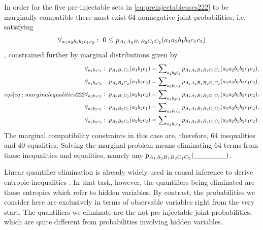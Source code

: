In order for the five pre-injectable sets in \cref{eq:preinjectableuses222} to be marginally compatible there must exist 64 nonnegative joint probabilities, i.e. satisfying
\begin{align}\label{eq:nonnegativity}
\forall_{a_1 a_2 b_1 b_2 c_1 c_2}:\;0\leq \p[A_1 A_2 B_1 B_2 C_1 C_2]{a_1 a_2 b_1 b_2 c_1 c_2}
\end{align}, constrained further by marginal distributions given by
\begin{align}\label[eqs]{eq:marginalequalities222}
\begin{split}
&\forall_{a_1 b_1 c_1}:\;\p[A_1 B_1 C_1]{a_1 b_1 c_1} = \sum\nolimits_{a_2 b_2 b_2}\p[A_1 A_2 B_1 B_2 C_1 C_2]{a_1 a_2 b_1 b_2 c_1 c_2},\\
&\forall_{a_1 b_2 c_2}:\;\p[A_2 B_2 C_2]{a_1 b_2 c_2} = \sum\nolimits_{a_2 b_1 c_1}\p[A_1 A_2 B_1 B_2 C_1 C_2]{a_1 a_2 b_1 b_2 c_1 c_2},\\
&\forall_{a_2 b_1 c_2}:\;\p[A_2 B_1 C_2]{a_2 b_1 c_2} = \sum\nolimits_{a_1 b_2 c_1}\p[A_1 A_2 B_1 B_2 C_1 C_2]{a_1 a_2 b_1 b_2 c_1 c_2},\\
&\forall_{a_2 b_2 c_1}:\;\p[A_2 B_2 C_1]{a_2 b_2 c_1} = \sum\nolimits_{a_1 b_1 c_2}\p[A_1 A_2 B_1 B_2 C_1 C_2]{a_1 a_2 b_1 b_2 c_1 c_2},\\
&\forall_{a_2 b_2 c_2}:\;\p[A_2 B_2 C_2]{a_2 b_2 c_2} = \sum\nolimits_{a_1 b_1 c_1}\p[A_1 A_2 B_1 B_2 C_1 C_2]{a_1 a_2 b_1 b_2 c_1 c_2}.
\end{split}
\end{align}
The marginal compatibility constraints in this case are, therefore, 64 inequalities and 40 equalities. Solving the marginal problem means eliminating 64 terms from those inequalities and equalities, namely any $\p[A_1 A_2 B_1 B_2 C_1 C_2]{\_\_\_\_\_\_}$. 


Linear quantifier elimination is already widely used in causal inference to derive entropic inequalities \cite{fritz2013marginal,chaves2014novel,chaves2014informationinference}. In that task, however, the quantifiers being eliminated are those entropies which refer to hidden variables. By contrast, the probabilities we consider here are exclusively in terms of observable variables right from the very start. The quantifiers we eliminate are the not-pre-injectable joint probabilities, which are quite different from probabilities involving hidden variables.

